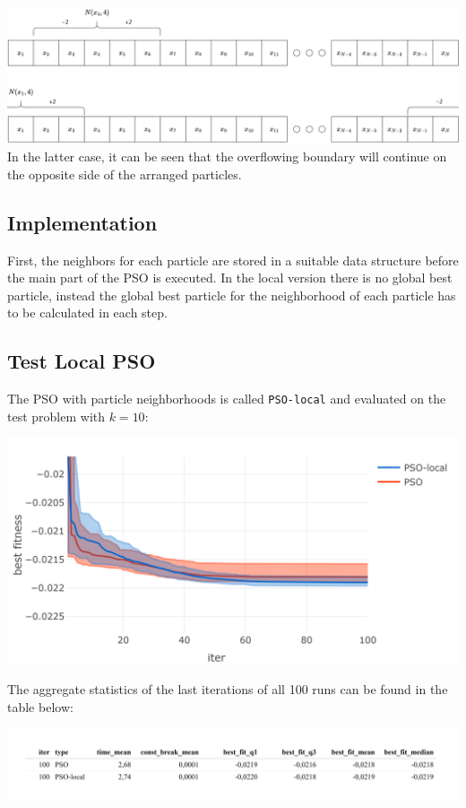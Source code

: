 \documentclass[
  oneside]{book}
\begin{document}
\includegraphics{img/PSO_local_chart.jpg}
In the latter case, it can be seen that the overflowing boundary will continue on the opposite side of the arranged particles.

\hypertarget{implementation-1}{%
\subsection{Implementation}\label{implementation-1}}

First, the neighbors for each particle are stored in a suitable data structure before the main part of the PSO is executed. In the local version there is no global best particle, instead the global best particle for the neighborhood of each particle has to be calculated in each step.

\hypertarget{test-local-pso}{%
\subsection{Test Local PSO}\label{test-local-pso}}

The PSO with particle neighborhoods is called \texttt{PSO-local} and evaluated on the test problem with \(k=10\):

\includegraphics{Master_Thesis_files/figure-latex/variants5-1.png}

The aggregate statistics of the last iterations of all 100 runs can be found in the table below:

\includegraphics{Master_Thesis_files/figure-latex/variants6-1.png}
\end{document}
